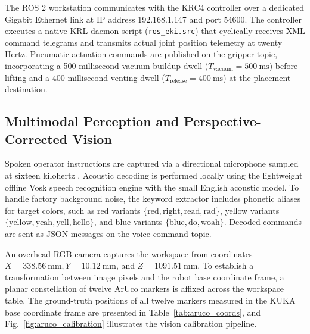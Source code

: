 \documentclass{svproc}
\begin{document}
The ROS 2 workstation communicates with the KRC4 controller over a dedicated Gigabit Ethernet link at IP address 192.168.1.147 and port 54600. The controller executes a native KRL daemon script (\texttt{ros\_eki.src}) \cite{kuka_eki2019} that cyclically receives XML command telegrams and transmits actual joint position telemetry at twenty Hertz. Pneumatic actuation commands are published on the gripper topic, incorporating a 500-millisecond vacuum buildup dwell ($T_{\text{vacuum}} = \SI{500}{\milli\second}$) before lifting and a 400-millisecond venting dwell ($T_{\text{release}} = \SI{400}{\milli\second}$) at the placement destination.

\subsection{Multimodal Perception and Perspective-Corrected Vision}
Spoken operator instructions are captured via a directional microphone sampled at sixteen kilohertz \cite{quirubot2012,voice_ros2_2024}. Acoustic decoding is performed locally using the lightweight offline Vosk speech recognition engine \cite{vosk2020} with the small English acoustic model. To handle factory background noise, the keyword extractor includes phonetic aliases for target colors, such as red variants $\{\text{red}, \text{right}, \text{read}, \text{rad}\}$, yellow variants $\{\text{yellow}, \text{yeah}, \text{yell}, \text{hello}\}$, and blue variants $\{\text{blue}, \text{do}, \text{woah}\}$. Decoded commands are sent as JSON messages on the voice command topic.

An overhead RGB camera captures the workspace from coordinates $X = \SI{338.56}{\milli\meter}, Y = \SI{10.12}{\milli\meter}$, and $Z = \SI{1091.51}{\milli\meter}$. To establish a transformation between image pixels and the robot base coordinate frame, a planar constellation of twelve ArUco markers \cite{aruco2014} is affixed across the workspace table. The ground-truth positions of all twelve markers measured in the KUKA base coordinate frame are presented in Table~\ref{tab:aruco_coords}, and Fig.~\ref{fig:aruco_calibration} illustrates the vision calibration pipeline.
\end{document}
